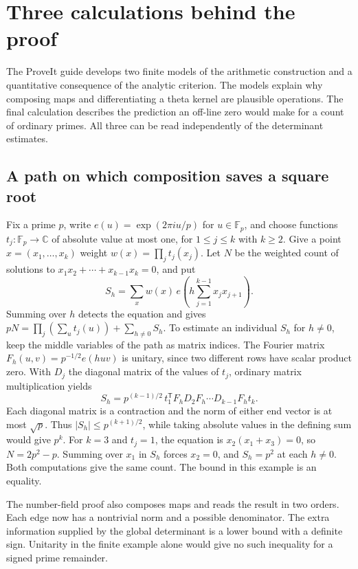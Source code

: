\section{Three calculations behind the proof}\label{sec:worked-guide}

The ProveIt guide develops two finite models of the arithmetic construction and a quantitative consequence of the analytic criterion. The models explain why composing maps and differentiating a theta kernel are plausible operations. The final calculation describes the prediction an off-line zero would make for a count of ordinary primes. All three can be read independently of the determinant estimates.

\subsection{A path on which composition saves a square root}

Fix a prime $p$, write $e(u)=\exp(2\pi i u/p)$ for $u\in\mathbb F_p$, and choose functions $t_j:\mathbb F_p\to\mathbb C$ of absolute value at most one, for $1\le j\le k$ with $k\ge2$. Give a point $x=(x_1,\ldots,x_k)$ weight $w(x)=\prod_jt_j(x_j)$. Let $N$ be the weighted count of solutions to $x_1x_2+\cdots+x_{k-1}x_k=0$, and put
\[
 S_h=\sum_x w(x)\, e\!\left(h\sum_{j=1}^{k-1}x_jx_{j+1}\right).
\]
Summing over $h$ detects the equation and gives $pN=\prod_j(\sum_u t_j(u))+\sum_{h\ne0} S_h$. To estimate an individual $S_h$ for $h\ne0$, keep the middle variables of the path as matrix indices. The Fourier matrix $F_h(u,v)=p^{-1/2}e(huv)$ is unitary, since two different rows have scalar product zero. With $D_j$ the diagonal matrix of the values of $t_j$, ordinary matrix multiplication yields
\[
 S_h=p^{(k-1)/2}\,t_1^{\mathsf T} F_h D_2 F_h\cdots D_{k-1}F_h t_k .
\]
Each diagonal matrix is a contraction and the norm of either end vector is at most $\sqrt p$. Thus $|S_h|\le p^{(k+1)/2}$, while taking absolute values in the defining sum would give $p^k$. For $k=3$ and $t_j=1$, the equation is $x_2(x_1+x_3)=0$, so $N=2p^2-p$. Summing over $x_1$ in $S_h$ forces $x_2=0$, and $S_h=p^2$ at each $h\ne0$. Both computations give the same count. The bound in this example is an equality.

The number-field proof also composes maps and reads the result in two orders. Each edge now has a nontrivial norm and a possible denominator. The extra information supplied by the global determinant is a lower bound with a definite sign. Unitarity in the finite example alone would give no such inequality for a signed prime remainder.

